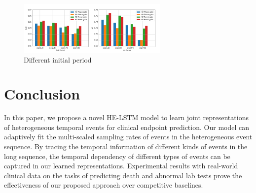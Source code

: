 \documentclass[letterpaper]{article} %
\begin{document}
\begin{figure}[!t]
\centering
\includegraphics[width=0.8720000000000001\linewidth,height=1.04in ]{init_period.png}

\caption{Different initial period}

\label{fig:period}
\end{figure}







\section{Conclusion}
In this paper, we propose a novel HE-LSTM model
to learn joint representations of heterogeneous temporal events for clinical endpoint prediction.
Our model can adaptively fit the multi-scaled sampling rates of events in the heterogeneous event sequence. By tracing the temporal information of different kinds of events in the long sequence, the temporal dependency of different types of events can be captured in our learned representations.
Experimental results with real-world clinical data on the tasks of predicting death and abnormal lab tests prove the effectiveness of our proposed approach over competitive baselines.

\vspace{-3.70mm}
\end{document}

